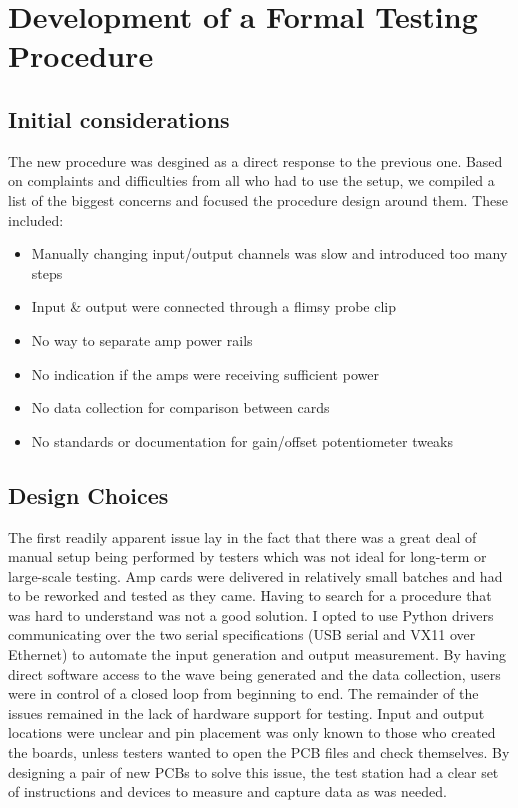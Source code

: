 %
%
\chapter{Development of a Formal Testing Procedure}
\section{Initial considerations}
The new procedure was desgined as a direct response to the previous one. Based on complaints and difficulties from all who had to use the setup, we compiled a list of the biggest concerns and focused the procedure design around them. These included:
\begin{itemize}
	\item Manually changing input/output channels was slow and introduced too many steps
	\item Input \& output were connected through a flimsy probe clip
	\item No way to separate amp power rails
	\item No indication if the amps were receiving sufficient power
	\item No data collection for comparison between cards
	\item No standards or documentation for gain/offset potentiometer tweaks
\end{itemize}
\section{Design Choices}
The first readily apparent issue lay in the fact that there was a great deal of manual setup being performed by testers which was not ideal for long-term or large-scale testing. Amp cards were delivered in relatively small batches and had to be reworked and tested as they came. Having to search for a procedure that was hard to understand was not a good solution. I opted to use Python drivers communicating over the two serial specifications (USB serial and VX11 over Ethernet) to automate the input generation and output measurement. By having direct software access to the wave being generated and the data collection, users were in control of a closed loop from beginning to end. The remainder of the issues remained in the lack of hardware support for testing. Input and output locations were unclear and pin placement was only known to those who created the boards, unless testers wanted to open the PCB files and check themselves. By designing a pair of new PCBs to solve this issue, the test station had a clear set of instructions and devices to measure and capture data as was needed.


